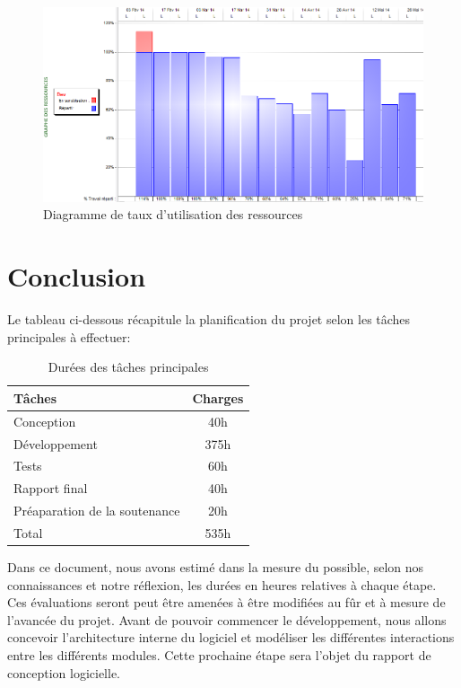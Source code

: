 \documentclass[a4paper]{report}
\begin{document}
\begin{figure}
\centering
\includegraphics[width=1.5\textwidth, angle=90]{UtilisationDesRessources.png}

\caption{\label{fig:sample-graph}Diagramme de taux d'utilisation des ressources}
\end{figure}




\chapter{Conclusion}

Le tableau ci-dessous récapitule la planification du projet selon les tâches principales à effectuer:

\begin{table}[H]
\centering
  \begin{tabularx}{0.8\textwidth}{| X | c |}
    \hline
	Tâches & Charges \\
    \hline
    Conception & 40h \\
    Développement & 375h \\
    Tests & 60h \\
    Rapport final & 40h \\
    Préaparation de la soutenance & 20h \\
    \hline
	Total & 535h \\
    \hline
  \end{tabularx}
  \caption{Durées des tâches principales}
\end{table}

Dans ce document, nous avons estimé dans la mesure du possible, selon nos connaissances et notre réflexion, les durées en heures relatives à chaque étape. Ces évaluations seront peut être amenées à être modifiées au fûr et à mesure de l'avancée du projet.
Avant de pouvoir commencer le développement, nous allons concevoir l'architecture interne du logiciel et modéliser les différentes interactions entre les différents modules. Cette prochaine étape sera l'objet du rapport de conception logicielle.
\end{document}
